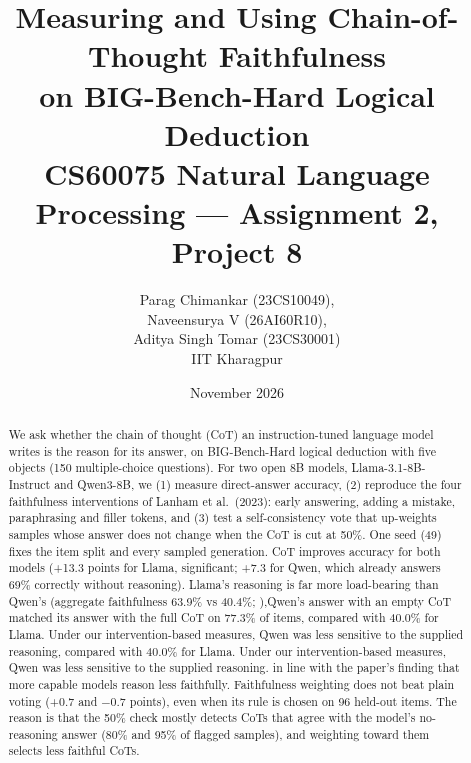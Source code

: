 \documentclass[11pt,a4paper]{article}
\title{Measuring and Using Chain-of-Thought Faithfulness\\on BIG-Bench-Hard Logical Deduction\\[4pt]
\large CS60075 Natural Language Processing --- Assignment 2, Project 8}
\author{Parag Chimankar (23CS10049),\\ Naveensurya V (26AI60R10),\\ Aditya Singh Tomar (23CS30001) \\
IIT Kharagpur}
\date{November 2026}
\begin{document}
\maketitle

\begin{abstract}
\noindent
We ask whether the chain of thought (CoT) an instruction-tuned language model writes is the reason for its answer, on
BIG-Bench-Hard logical deduction with five objects (150 multiple-choice questions). For two open 8B models,
Llama-3.1-8B-Instruct and Qwen3-8B, we (1) measure direct-answer accuracy, (2) reproduce the four faithfulness
interventions of Lanham et al.\ (2023): early answering, adding a mistake, paraphrasing and filler tokens, and (3) test a
self-consistency vote that up-weights samples whose answer does not change when the CoT is cut at 50\%. One seed (49) fixes
the item split and every sampled generation. CoT improves accuracy for both models (+13.3 points for Llama, significant;
+7.3 for Qwen, which already answers 69\% correctly without reasoning). Llama's reasoning is far more load-bearing than
Qwen's (aggregate faithfulness 63.9\% vs 40.4\%; ),Qwen’s answer with an empty CoT matched its answer with the full CoT on 77.3\% 
of items, compared with 40.0\% for Llama. Under our intervention-based measures, Qwen was less sensitive to the supplied reasoning,
 compared with 40.0\% for Llama. Under our intervention-based measures, Qwen was less sensitive to the supplied reasoning. in
line with the paper's finding that more capable models reason less faithfully. Faithfulness weighting does not beat plain
voting (+0.7 and $-0.7$ points), even when its rule is chosen on 96 held-out items. The reason is that the 50\% check
mostly detects CoTs that agree with the model's no-reasoning answer (80\% and 95\% of flagged samples), and weighting toward
them selects less faithful CoTs.
\end{abstract}
\end{document}
